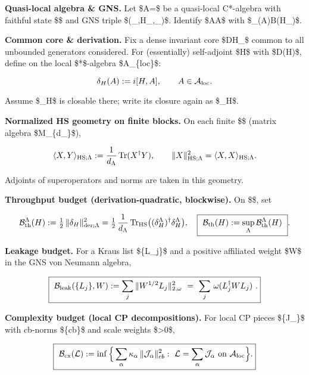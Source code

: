 \documentclass[
]{article}
\numberwithin{equation}{section}
\begin{document}
\textbf{Quasi-local algebra \& GNS.} Let
\$\mathcal A=\$ be a
quasi-local C*-algebra with faithful state \$\omega\$ and GNS triple
\$(\pi\_\omega,\mathcal H\_\omega,\Omega\_\omega)\$. Identify
\$A\in\mathcal A\$ with
\$\pi\_\omega(A)\subset\mathcal B(\mathcal H\_\omega)\$.

\textbf{Common core \& derivation.} Fix a dense invariant core
\$\mathcal D\subset\mathcal H\_\omega\$ common to all unbounded
generators considered. For (essentially) self-adjoint \$H\$ with
\$\mathcal D\subset{}(H)\$, define on the local \$*\$-algebra
\$\mathcal A\_\{\rm loc\}\$:

\[
\delta_H(A):=i[H,A],\qquad A\in\mathcal A_{\rm loc}.
\]

Assume \$\delta\_H\$ is closable there; write its closure again as
\$\delta\_H\$.

\textbf{Normalized HS geometry on finite blocks.} On each finite
\$\Lambda\$ (matrix algebra \$M\_\{d\_\Lambda\}\$),

\[
\langle X,Y\rangle_{\rm HS;\Lambda}:=\frac{1}{d_\Lambda}\operatorname{Tr}(X^\dagger Y),\qquad 
\|X\|_{{\rm HS};\Lambda}^2=\langle X,X\rangle_{{\rm HS};\Lambda}.
\]

Adjoints of superoperators and norms are taken in this geometry.

\textbf{Throughput budget (derivation-quadratic, blockwise).} On
\$\Lambda\$, set

\[
\mathcal B_{\rm th}^\Lambda(H):=\tfrac12\,\|\delta_H\|_{{\rm der};\Lambda}^{2}
=\tfrac12\,\frac{1}{d_\Lambda}\operatorname{Tr}_{\rm HS}\!\big((\delta_H^\Lambda)^{\dagger}\delta_H^\Lambda\big),
\quad
\boxed{\ \mathcal B_{\rm th}(H):=\sup_\Lambda \mathcal B_{\rm th}^\Lambda(H)\ }.
\]

\textbf{Leakage budget.} For a Kraus list \$\{L\_j\}\$ and a positive
affiliated weight \$W\$ in the GNS von Neumann algebra,

\[
\boxed{\ \mathcal B_{\rm leak}(\{L_j\},W):=\sum_j \|W^{1/2}L_j\|_{2,\omega}^2\ =\ \sum_j\,\omega(L_j^{\dagger} W L_j)\ . }
\]

\textbf{Complexity budget (local CP decompositions).} For local CP
pieces \$\{\mathcal J\_\alpha\}\$ with cb-norms
\$\textbar{}\cdot\textbar*\{cb\}\$ and scale weights
\$\kappa*\alpha\textgreater0\$,

\[
\boxed{\ \mathcal B_{\rm cx}(\mathcal L):=\inf\Big\{\sum_\alpha \kappa_\alpha\,\|\mathcal J_\alpha\|_{cb}^2:\ \mathcal L=\sum_\alpha\mathcal J_\alpha\ \text{on}\ \mathcal A_{\rm loc}\Big\}.}
\]
\end{document}
